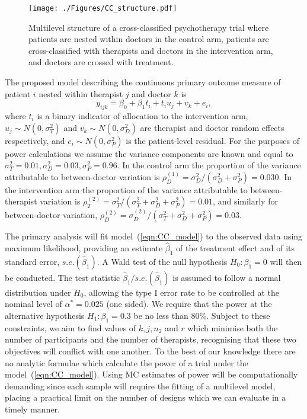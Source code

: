 \documentclass{article} %
\begin{document}
\begin{figure}
\centering
\texttt{[image: ./Figures/CC\_structure.pdf]}
\caption{Multilevel structure of a cross-classified psychotherapy trial where patients are nested within doctors in the control arm, patients are cross-classified with therapists and doctors in the intervention arm, and doctors are crossed with treatment.}
\label{fig:CC_structure}
\end{figure}

The proposed model describing the continuous primary outcome measure of patient $i$ nested within therapist $j$ and doctor $k$ is
\begin{equation}\label{eqn:CC_model}
y_{ijk} = \beta_{0} + \beta_{1}t_{i} + t_{i}u_{j} + v_{k} + e_{i},
\end{equation}
where $t_{i}$ is a binary indicator of allocation to the intervention arm, $u_{j} \sim N(0, \sigma_{T}^{2})$ and $v_{k} \sim N(0, \sigma_{D}^{2})$ are therapist and doctor random effects respectively, and $e_{i} \sim N(0, \sigma_{P}^{2})$ is the patient-level residual. For the purposes of power calculations we assume the variance components are known and equal to $\sigma_{T}^{2} = 0.01, \sigma_{D}^{2} = 0.03, \sigma_{P}^{2} = 0.96$. In the control arm the proportion of the variance attributable to between-doctor variation is $\rho_{D}^{(1)} = \sigma^{2}_{D}/(\sigma^{2}_{D} + \sigma^{2}_{P}) = 0.030$. In the intervention arm the proportion of the variance attributable to between-therapist variation is $\rho_{T}^{(2)} = \sigma^{2}_{T}/(\sigma^{2}_{T} + \sigma^{2}_{D} + \sigma^{2}_{P}) = 0.01$, and similarly for between-doctor variation, $\rho_{D}^{(2)} = \sigma^{(2)}_{D}/(\sigma^{2}_{T} + \sigma^{2}_{D} + \sigma^{2}_{P}) = 0.03$.

The primary analysis will fit model~(\ref{eqn:CC_model}) to the observed data using maximum likelihood, providing an estimate $\hat{\beta}_{1}$ of the treatment effect and of its standard error, $s.e.(\hat{\beta}_{1})$. A Wald test of the null hypothesis $H_{0}: \beta_{1} = 0$ will then be conducted. The test statistic $\hat{\beta}_{1} / s.e.(\hat{\beta}_{1})$ is assumed to follow a normal distribution under $H_{0}$, allowing the type I error rate to be controlled at the nominal level of $\alpha^{*} = 0.025$ (one sided). We require that the power at the alternative hypothesis $H_{1}: \beta_{1} = 0.3$ be no less than 80\%. Subject to these constraints, we aim to find values of $k, j, n_{2}$ and $r$ which minimise both the number of participants and the number of therapists, recognising that these two objectives will conflict with one another. To the best of our knowledge there are no analytic formulae which calculate the power of a trial under the model~(\ref{eqn:CC_model}). Using MC estimates of power will be computationally demanding since each sample will require the fitting of a multilevel model, placing a practical limit on the number of designs which we can evaluate in a timely manner. 
\end{document}
